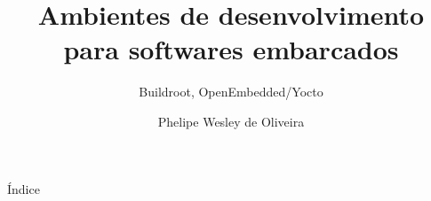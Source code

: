 \documentclass{bredelebeamer}
\title[Titre version courte]{Ambientes de desenvolvimento para softwares embarcados}
\subtitle{Buildroot, OpenEmbedded/Yocto}
\author[Oliveira, P. W.]{Phelipe Wesley de Oliveira\inst{1}}
\institute[UFC]
{
  \inst{1}%
  Universidade Federal do Ceará
  }
\date{}
\begin{document}
\begin{frame}
  \titlepage
\end{frame}

\logo{}



\begin{frame}{Índice}
  \tableofcontents
\end{frame}




\end{document}
